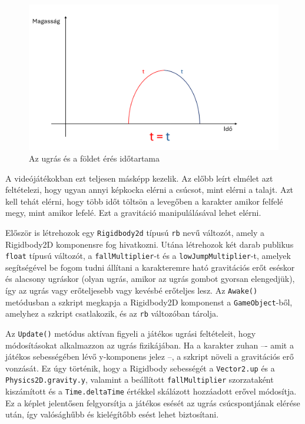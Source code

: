 \begin{figure}[ht]
\centering
\includegraphics[width=\linewidth]{images/betterjumpgraph.png}
\caption{Az ugrás és a földet érés időtartama\cite{betterjump}}
\label{fig:betterjumpgraph}
\end{figure}

A videójátékokban ezt teljesen másképp kezelik. Az előbb leírt elmélet azt feltételezi, hogy ugyan annyi képkocka elérni a csúcsot, mint elérni a talajt. Azt kell tehát elérni, hogy több időt töltsön a levegőben a karakter amikor felfelé megy, mint amikor lefelé. Ezt a gravitáció manipulálásával lehet elérni.\cite{betterjump}

Először is létrehozok egy \texttt{Rigidbody2d} típusú \texttt{rb} nevű változót, amely a Rigidbody2D komponensre fog hivatkozni. Utána létrehozok két darab publikus \texttt{float} típusú változót, a \texttt{fallMultiplier}-t és a \texttt{lowJumpMultiplier}-t, amelyek segítségével be fogom tudni állítani a karakteremre ható gravitációs erőt eséskor és alacsony ugráskor (olyan ugrás, amikor az ugrás gombot gyorsan elengedjük), így az ugrás vagy erőteljesebb vagy kevésbé erőteljes lesz. Az \texttt{Awake()} metódusban a szkript megkapja a Rigidbody2D komponenst a \texttt{GameObject}-ből, amelyhez a szkript csatlakozik, és az \texttt{rb} változóban tárolja.

Az \texttt{Update()} metódus aktívan figyeli a játékos ugrási feltételeit, hogy módosításokat alkalmazzon az ugrás fizikájában. Ha a karakter zuhan –- amit a játékos sebességében lévő y-komponens jelez --, a szkript növeli a gravitációs erő vonzását. Ez úgy történik, hogy a Rigidbody sebességét a \texttt{Vector2.up} és a \texttt{Physics2D.gravity.y}, valamint a beállított \texttt{fallMultiplier} szorzataként kiszámított és a \texttt{Time.deltaTime} értékkel skálázott hozzáadott erővel módosítja. Ez a képlet jelentősen felgyorsítja a játékos esését az ugrás csúcspontjának elérése után, így valósághűbb és kielégítőbb esést lehet biztosítani.

